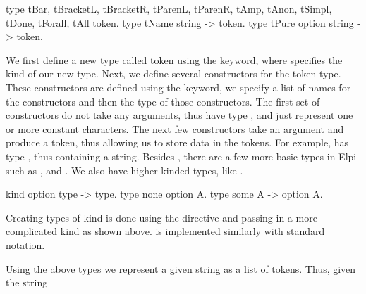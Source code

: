 \documentclass[thesis.tex]{subfiles}
\begin{document}
{\begin{elpicode}
  type tBar, tBracketL, tBracketR, tParenL, tParenR,
       tAmp, tAnon, tSimpl, tDone, tForall, tAll token.
  type tName string -> token.
  type tPure option string -> token.
\end{elpicode}
We first define a new type called token using the  keyword, where  specifies the kind of our new type. Next, we define several constructors for the token type. These constructors are defined using the  keyword, we specify a list of names for the constructors and then the type of those constructors. The first set of constructors do not take any arguments, thus have type , and just represent one or more constant characters. The next few constructors take an argument and produce a token, thus allowing us to store data in the tokens. For example,  has type , thus containing a string. Besides , there are a few more basic types in Elpi such as ,  and . We also have higher kinded types, like .
\begin{elpicode}
  kind option type -> type.
  type none option A.
  type some A -> option A.
\end{elpicode}
Creating types of kind  is done using the  directive and passing in a more complicated kind as shown above.  is implemented similarly with standard notation.

Using the above types we represent a given string as a list of tokens. Thus, given the string \elpii{"[H %
\begin{center}
  \elpii{[tBracketL, tName "H", tPure (some "H'"), tBracketR]}
\end{center}

}}
\end{document}
